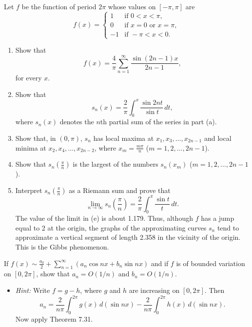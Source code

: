 \begin{problembox}
Let $f$ be the function of period $2\pi$ whose values on $[-\pi, \pi]$ are
\[
f(x) = 
\begin{cases} 
1 & \text{if } 0 < x < \pi, \\
0 & \text{if } x = 0 \text{ or } x = \pi, \\
-1 & \text{if } -\pi < x < 0.
\end{cases}
\]
\begin{enumerate}[label=(\alph*)]
\item Show that
\[
f(x) = \frac{4}{\pi} \sum_{n=1}^\infty \frac{\sin (2n - 1)x}{2n - 1},
\]
for every $x$.
\item Show that
\[
s_n(x) = \frac{2}{\pi} \int_0^x \frac{\sin 2nt}{\sin t} \, dt,
\]
where $s_n(x)$ denotes the $n$th partial sum of the series in part (a).
\item Show that, in $(0, \pi)$, $s_n$ has local maxima at $x_1, x_3, \dots, x_{2n-1}$ and local minima at $x_2, x_4, \dots, x_{2n-2}$, where $x_m = \frac{m\pi}{n}$ ($m = 1, 2, \dots, 2n - 1$).
\item Show that $s_n\left(\frac{\pi}{n}\right)$ is the largest of the numbers $s_n(x_m)$ ($m = 1, 2, \dots, 2n - 1$).
\item Interpret $s_n\left(\frac{\pi}{n}\right)$ as a Riemann sum and prove that
\[
\lim_{n \to \infty} s_n\left(\frac{\pi}{n}\right) = \frac{2}{\pi} \int_0^\pi \frac{\sin t}{t} \, dt.
\]
The value of the limit in (e) is about 1.179. Thus, although $f$ has a jump equal to 2 at the origin, the graphs of the approximating curves $s_n$ tend to approximate a vertical segment of length 2.358 in the vicinity of the origin. This is the Gibbs phenomenon.
\end{enumerate}
\end{problembox}

\begin{problembox}
If $f(x) \sim \frac{a_0}{2} + \sum_{n=1}^\infty (a_n \cos nx + b_n \sin nx)$ and if $f$ is of bounded variation on $[0, 2\pi]$, show that $a_n = O(1/n)$ and $b_n = O(1/n)$.
\begin{itemize}
\item \textit{Hint:} Write $f = g - h$, where $g$ and $h$ are increasing on $[0, 2\pi]$. Then
\[
a_n = \frac{2}{n\pi} \int_0^{2\pi} g(x) \, d(\sin nx) - \frac{2}{n\pi} \int_0^{2\pi} h(x) \, d(\sin nx).
\]
Now apply Theorem 7.31.
\end{itemize}
\end{problembox}

